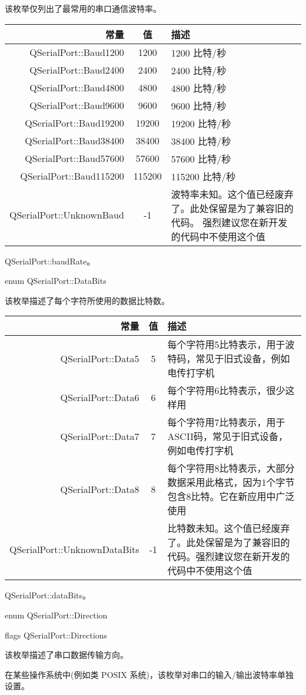 \begin{notice}
该枚举仅列出了最常用的串口通信波特率。
\end{notice}


\begin{longtable}{|r|c|m{20em}|}
\hline
常量	&值&	描述 \\ 
\hline
QSerialPort::Baud1200 &	1200&	1200 比特/秒 \\ 
\hline
QSerialPort::Baud2400	&2400&	2400 比特/秒 \\ 
\hline
QSerialPort::Baud4800	&4800&	4800 比特/秒 \\ 
\hline
QSerialPort::Baud9600	&9600&	9600 比特/秒 \\ 
\hline
QSerialPort::Baud19200	&19200&	19200 比特/秒 \\ 
\hline
QSerialPort::Baud38400	&38400	&38400 比特/秒 \\ 
\hline
QSerialPort::Baud57600	&57600	&57600 比特/秒 \\ 
\hline
QSerialPort::Baud115200&	115200&	115200 比特/秒 \\ 
\hline
QSerialPort::UnknownBaud	&-1	&波特率未知。这个值已经废弃了。此处保留是为了兼容旧的代码。
 强烈建议您在新开发的代码中不使用这个值 \\ 
\hline
\end{longtable}

\begin{seeAlso}
QSerialPort::baudRate。
\end{seeAlso}

enum QSerialPort::DataBits

该枚举描述了每个字符所使用的数据比特数。

\begin{longtable}{|r|c|m{20em}|}
\hline
常量	&值&	描述 \\ 
\hline 
QSerialPort::Data5 &	5&	每个字符用5比特表示，用于波特码，常见于旧式设备，例如电传打字机 \\ 
\hline
QSerialPort::Data6	&6&	每个字符用6比特表示，很少这样用 \\ 
\hline
QSerialPort::Data7&	7&	每个字符用7比特表示，用于ASCII码，常见于旧式设备，例如电传打字机 \\ 
\hline
QSerialPort::Data8	&8	&每个字符用8比特表示，大部分数据采用此格式，因为1个字节包含8比特。它在新应用中广泛使用 \\ 
\hline
QSerialPort::UnknownDataBits&	-1&	比特数未知。这个值已经废弃了。此处保留是为了兼容旧的代码。强烈建议您在新开发的代码中不使用这个值 \\ 
	\hline
\end{longtable}

\begin{seeAlso}
QSerialPort::dataBits。
\end{seeAlso}

enum QSerialPort::Direction

flags QSerialPort::Directions

该枚举描述了串口数据传输方向。

\begin{notice}
在某些操作系统中(例如类 POSIX 系统)，该枚举对串口的输入/输出波特率单独设置。
\end{notice}